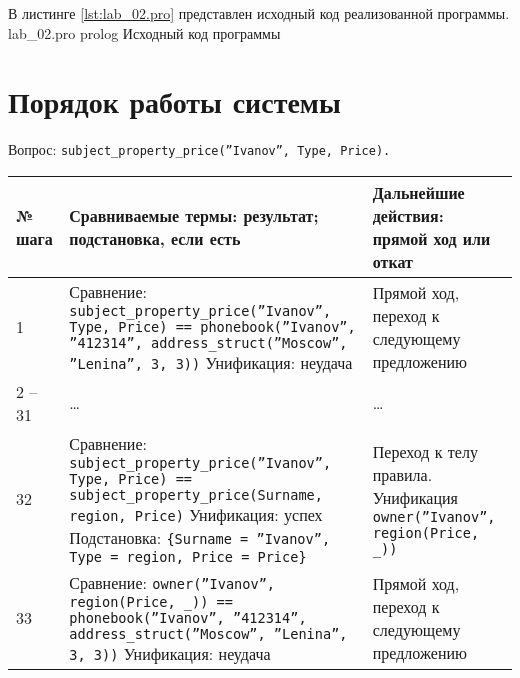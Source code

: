 В листинге \ref{lst:lab_02.pro} представлен исходный код реализованной программы.
	{lab_02.pro}
	{prolog}
	{Исходный код программы}

\section{Порядок работы системы}

Вопрос: \texttt{subject\_property\_price(''Ivanov'', Type, Price).}

	\footnotesize
	\begin{xltabular}{\textwidth}{|l|X|Y|}
		\hline
		\textbf{№ шага} &
		\textbf{Сравниваемые термы: результат; подстановка, если есть} &
		\textbf{Дальнейшие действия: прямой ход или откат} \\ \hline

		1 & 
		Сравнение:\newline
		\texttt{subject\_property\_price(''Ivanov'', Type, Price) == phonebook(''Ivanov'', ''412314'', address\_struct(''Moscow'', ''Lenina'', 3, 3))} \newline\newline
		Унификация: неудача &
		Прямой ход, переход к следующему предложению \\ \hline

		2 -- 31 & \centering \dots & \dots \\ \hline

		32 &
		Сравнение:\newline
		\texttt{subject\_property\_price(''Ivanov'', Type, Price) == subject\_property\_price(Surname, region, Price)} \newline\newline
		Унификация: успех \newline\newline
		Подстановка:\newline
		\texttt{\{Surname = ''Ivanov'', Type = region, Price = Price\}} & 
		Переход к телу правила. \newline\newline
		Унификация\newline
		\texttt{owner(''Ivanov'', region(Price, \_))} \\ \hline

		33 &
		Сравнение:\newline
		\texttt{owner(''Ivanov'', region(Price, \_)) == phonebook(''Ivanov'', ''412314'', address\_struct(''Moscow'', ''Lenina'', 3, 3))} \newline\newline
		Унификация: неудача &
		Прямой ход, переход к следующему предложению \\ \hline


\end{xltabular}

